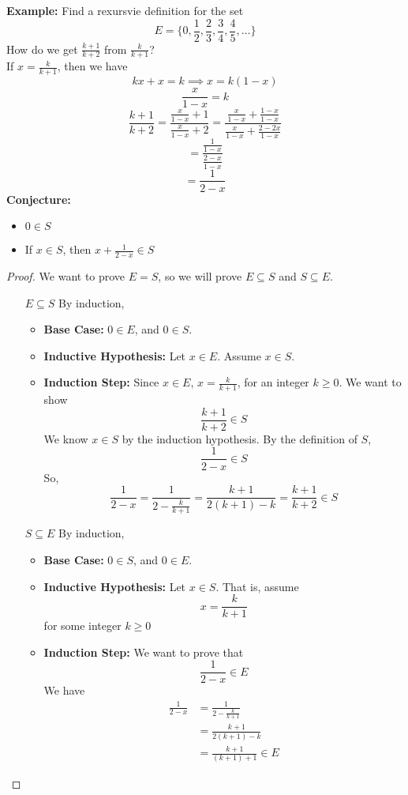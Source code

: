 \documentclass[openany]{report}
\begin{document}
\textbf{Example:} Find a rexursvie definition for the set 
\[E = \{0, \frac{1}{2}, \frac{2}{3}, \frac{3}{4}, \frac{4}{5}, \ldots\}\]
How do we get $\frac{k + 1}{k+2}$ from $\frac{k}{k+1}$?\\[2ex]
If $x = \frac{k}{k+1}$, then we have
\[kx + x = k \implies x = k(1-x)\]
\[\frac{x}{1-x} = k\]
\[\frac{k+1}{k+2} = \frac{\frac{x}{1-x} + 1}{\frac{x}{1-x} + 2} =  \frac{\frac{x}{1-x} + \frac{1-x}{1-x}}{\frac{x}{1-x} + \frac{2-2x}{1-x}}\]
\[ = \frac{\frac{1}{1-x}}{\frac{2-x}{1-x}}\]
\[= \frac{1}{2-x}\]
\textbf{Conjecture:}
\begin{itemize}
    \item $0 \in S$
    \item If $x \in S$, then $x + \frac{1}{2-x} \in S$
\end{itemize}
\begin{proof}
    We want to prove $E = S$, so we will prove $E \subseteq S$ and $S \subseteq E$.
    \begin{enumerate}
        \item [$E \subseteq S$] By induction,
        \begin{itemize}
            \item \textbf{Base Case:} $0 \in E$, and $0 \in S$. 
            \item \textbf{Inductive Hypothesis:} Let $x \in E$. Assume $x \in S$.
            \item \textbf{Induction Step:} Since $x \in E$, $x = \frac{k}{k+1}$, for an integer $k \geq 0$. We want to show 
            \[\frac{k+1}{k+2} \in S\]
            We know $x \in S$ by the induction hypothesis. By the definition of $S$, 
            \[\frac{1}{2-x} \in S\]
            So,
            \[\frac{1}{2-x} = \frac{1}{2 - \frac{k}{k+1}} = \frac{k+1}{2(k +1) - k} = \frac{k+1}{k+2} \in S\]
        \end{itemize}
        \item [$S \subseteq E$] By induction,
        \begin{itemize}
            \item \textbf{Base Case:} $0 \in S$, and $0 \in E$.
            \item \textbf{Inductive Hypothesis:} Let $x \in S$. That is, assume 
            \[x = \frac{k}{k+1}\]
            for some integer $k \geq 0$
            \item \textbf{Induction Step:} We want to prove that 
            \[\frac{1}{2-x} \in E\]
            We have 
            \begin{align*}
                \frac{1}{2-x} &= \frac{1}{2 - \frac{k}{k+1}}\tag{By the IH.}\\
                &= \frac{k+1}{2(k+1)-k}\\
                &= \frac{k+1}{(k+1)+1} \in E
            \end{align*}
        \end{itemize}
    \end{enumerate}
\end{proof}
\end{document}
